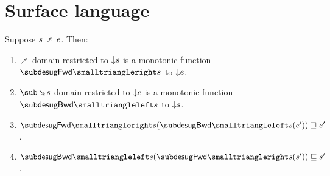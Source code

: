 \section{Surface language}











\begin{theorem}
  \label{thm:surface-language:desugar:gc}
     Suppose $s \desugarFwd e$. Then:
  \begin{enumerate}
     \item $\desugarFwd$ domain-restricted to ${\downarrow}{s}$ is a monotonic function $\desugarFwdF{s}$ to ${\downarrow}{e}$.
     \item $\desugarBwd{s}$ domain-restricted to ${\downarrow}{e}$ is a monotonic function $\desugarBwdF{s}$ to ${\downarrow}{s}$.
     \item $\desugarFwdF{s}(\desugarBwdF{s}(e')) \geq e'$.
     \item $\desugarBwdF{s}(\desugarFwdF{s}(s')) \leq s'$.
  \end{enumerate}
\end{theorem}
